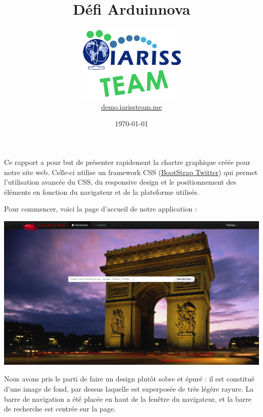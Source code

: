 \documentclass[12pt, a4paper]{article}
\title{Défi Arduinnova}
\newcommand{\espace}{\vspace{.8cm}}
\begin{document}
\author{\includegraphics{../_img/iariss_team.png} \\ {\sffamily \href{http://demo.iarissteam.me}{demo.iarissteam.me}}}
\date{\today}

\maketitle{}

{\sffamily Ce rapport a pour but de présenter rapidement la chartre graphique créée pour notre site web. Celle-ci utilise un framework CSS (\href{http://twitter.github.com/bootstrap/}{BootStrap Twitter}) qui permet l'utilisation avancée du CSS, du responsive design et le positionnement des éléments en fonction du navigateur et de la plateforme utilisés.} 

\espace{}
Pour commencer, voici la page d'accueil de notre application : 
\espace{}
\begin{center}
\includegraphics[width=.9\textwidth, keepaspectratio=true]{img/accueil.png}
\end{center}
\espace{}
Nous avons pris le parti de faire un design plutôt sobre et épuré : il est constitué d'une image de fond, par dessus laquelle est superposée de très légère rayure. La barre de navigation a été placée en haut de la fenêtre du navigateur, et la barre de recherche est centrée sur la page.
\end{document}
